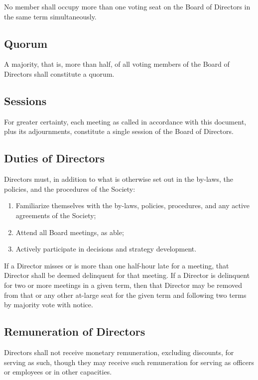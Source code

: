 No member shall occupy more than one voting seat on the Board of Directors in
the same term simultaneously. 

\subsection{Quorum}
A majority, that is, more than half, of all voting members of the Board of Directors shall
constitute a quorum.

\subsection{Sessions}
For greater certainty, each meeting as called in accordance with this document,
plus its adjournments, constitute a single session of the Board of Directors.

\subsection{Duties of Directors}
Directors must, in addition to what is otherwise set out in the by-laws, the
policies, and the procedures of the Society:
\begin{enumerate}
    \item Familiarize themselves with the by-laws, policies, 
        procedures, and any active agreements of the Society;
    \item Attend all Board meetings, as able;
    \item Actively participate in decisions and strategy development.
\end{enumerate}
If a Director misses or is more than one half-hour late for a meeting, that Director shall be deemed delinquent for that meeting. If a Director is delinquent for two or more meetings in a given term, then that Director may be removed from that or any other at-large seat for the given term and following two terms by majority vote with notice.

\subsection{Remuneration of Directors}
Directors shall not receive monetary remuneration, excluding discounts, for
serving as such, though they may receive such remuneration for serving as
officers or employees or in other capacities.
